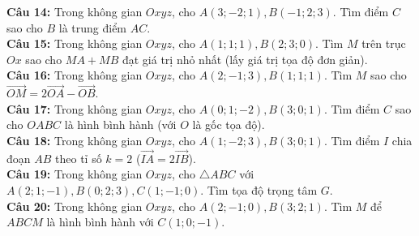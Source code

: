 \documentclass[12pt]{article}
\begin{document}
\begin{btxanh}
		\noindent \textbf{Câu 14:} Trong không gian $Oxyz$, cho $A(3; -2; 1), B(-1; 2; 3)$. Tìm điểm $C$ sao cho $B$ là trung điểm $AC$. \\
		\noindent \textbf{Câu 15:} Trong không gian $Oxyz$, cho $A(1; 1; 1), B(2; 3; 0)$. Tìm $M$ trên trục $Ox$ sao cho $MA + MB$ đạt giá trị nhỏ nhất (lấy giá trị tọa độ đơn giản). \\
		\noindent \textbf{Câu 16:} Trong không gian $Oxyz$, cho $A(2; -1; 3), B(1; 1; 1)$. Tìm $M$ sao cho $\vec{OM} = 2\vec{OA} - \vec{OB}$. \\
		\noindent \textbf{Câu 17:} Trong không gian $Oxyz$, cho $A(0; 1; -2), B(3; 0; 1)$. Tìm điểm $C$ sao cho $OABC$ là hình bình hành (với $O$ là gốc tọa độ). \\
		\noindent \textbf{Câu 18:} Trong không gian $Oxyz$, cho $A(1; -2; 3), B(3; 0; 1)$. Tìm điểm $I$ chia đoạn $AB$ theo tỉ số $k=2$ ($\vec{IA} = 2\vec{IB}$). \\
		\noindent \textbf{Câu 19:} Trong không gian $Oxyz$, cho $\triangle ABC$ với $A(2; 1; -1), B(0; 2; 3), C(1; -1; 0)$. Tìm tọa độ trọng tâm $G$. \\
		\noindent \textbf{Câu 20:} Trong không gian $Oxyz$, cho $A(2; -1; 0), B(3; 2; 1)$. Tìm $M$ để $ABCM$ là hình bình hành với $C(1; 0; -1)$.
	\end{btxanh}
\end{document}
